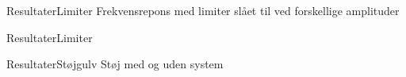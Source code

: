 \begin{frame}{Resultater}{Limiter}
Frekvensrepons med limiter slået til ved forskellige amplituder
\begin{figure}[H]
	\centering
	
\end{figure}
\end{frame}

\begin{frame}{Resultater}{Limiter}
\end{frame}

\begin{frame}{Resultater}{Støjgulv}
Støj med og uden system
\begin{figure}[H]
	\centering
	
\end{figure}
\end{frame}


